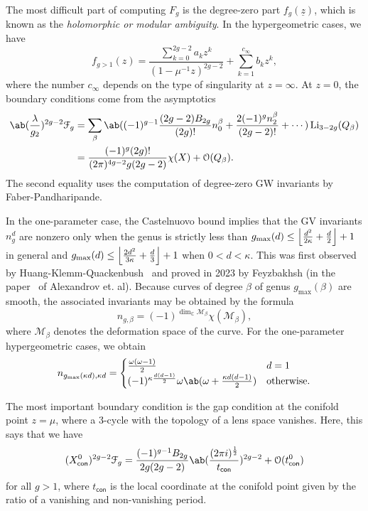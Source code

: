 \documentclass[10pt,oldfontcommands,oneside]{memoir}
\DeclarePairedDelimiter{\floor}{\lfloor}{\rfloor}
\theoremstyle{definition}
\theoremstyle{remark}
\theoremstyle{plain}
\theoremstyle{definition}
\theoremstyle{remark}
\newcommand{\C}{\mathbb{C}}
\newcommand{\M}{\mathcal{M}}
\newcommand{\mc}[1]{\mathcal{#1}}
\newcommand{\uz}{\ul{z}}
\newcommand{\on}[1]{\operatorname{#1}}
\newcommand{\ms}[1]{\mathsf{#1}}
\newcommand{\ul}[1]{\underline{#1}}
\newcommand{\1}{\mathbf{1}}
\newcommand{\2}{\mathbf{2}}
\newcommand{\3}{\mathbf{3}}
\begin{document}
The most difficult part of computing $F_g$ is the degree-zero part $f_g(\uz)$, which is known as the \textit{holomorphic or modular ambiguity}. In the hypergeometric cases, we have
\[ f_{g>1}(z) = \frac{\sum_{k=0}^{2g-2} a_k z^k}{( 1-\mu^{-1}z )^{2g-2}} + \sum_{k=1}^{c_{\infty}} b_k z^k, \]
where the number $c_{\infty}$ depends on the type of singularity at $z=\infty$. At $z=0$, the boundary conditions come from the asymptotics
\begin{align*}
    \ab(\frac{\lambda}{g_2})^{2g-2} \mc{F}_g &= \sum_{\beta} \ab((-1)^{g-1} \frac{(2g-2)B_{2g}}{(2g)!}n_0^{\beta} + \frac{2(-1)^g n_2^{\beta}}{(2g-2)!} + \cdots) \on{Li}_{3-2g}(Q_{\beta}) \\
    &= \frac{(-1)^g (2g)!}{(2\pi)^{4g-2}g(2g-2)}\chi(X) + \mc{O}(Q_{\beta}).
\end{align*}
The second equality uses the computation of degree-zero GW invariants by Faber-Pandharipande.

In the one-parameter case, the Castelnuovo bound implies that the GV invariants $n_g^d$ are nonzero only when the genus is strictly less than $g_{\max}(d) \leq \floor*{\frac{d^2}{2\kappa}+\frac{d}{2}}+1$ in general and $g_{\max}(d) \leq \floor*{\frac{2d^2}{3\kappa} + \frac{d}{3}}+1$ when $0 < d < \kappa$. This was first observed by Huang-Klemm-Quackenbush~\cite{hkq} and proved in 2023 by Feyzbakhsh (in the paper~\cite{qgeommod} of Alexandrov et. al). Because curves of degree $\beta$ of genus $g_{\max}(\beta)$ are smooth, the associated invariants may be obtained by the formula
\[ n_{g,\beta} = (-1)^{\dim_{\C} \M_{\beta}} \chi(\M_{\beta}), \]
where $\M_{\beta}$ denotes the deformation space of the curve. For the one-parameter hypergeometric cases, we obtain
\[ n_{g_{\max}(\kappa d),\kappa d} = \begin{cases}
    \frac{\omega(\omega-1)}{2} & d=1 \\
    (-1)^{\kappa \frac{d(d-1)}{2}} \omega \ab(\omega + \frac{\kappa d(d-1)}{2}) & \text{otherwise}.
\end{cases}
\]

The most important boundary condition is the gap condition at the conifold point $z=\mu$, where a $3$-cycle with the topology of a lens space vanishes. Here, this says that we have
\[ (X^0_{\ms{con}})^{2g-2}\mc{F}_g = \frac{(-1)^{g-1}B_{2g}}{2g(2g-2)} \ab(\frac{(2\pi i)^{\frac{1}{2}}}{t_{\ms{con}}})^{2g-2} + \mc{O}(t_{\ms{con}}^0) \]
for all $g > 1$, where $t_{\ms{con}}$ is the local coordinate at the conifold point given by the ratio of a vanishing and non-vanishing period.
\end{document}
